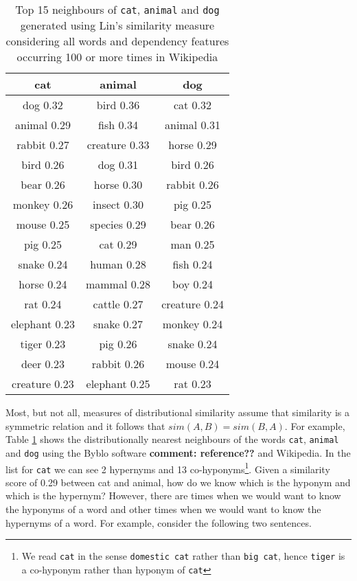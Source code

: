 \documentclass[11pt]{article}
\begin{document}
\begin{table}[ht]
\begin{tabular}{|c|c|c|}
\hline
cat&animal&dog\\
\hline
dog 0.32&bird 0.36&cat 0.32\\
animal 0.29&fish 0.34&animal 0.31\\
rabbit 0.27&creature 0.33&horse 0.29\\
bird 0.26&dog 0.31&bird 0.26\\
bear 0.26&horse 0.30&rabbit 0.26\\
monkey 0.26&insect 0.30&pig 0.25\\
mouse 0.25&species 0.29&bear 0.26\\
pig 0.25&cat 0.29&man 0.25\\
snake 0.24&human 0.28&fish 0.24\\
horse 0.24&mammal 0.28&boy 0.24\\
rat 0.24&cattle 0.27&creature 0.24\\
elephant 0.23&snake 0.27&monkey 0.24\\
tiger 0.23&pig 0.26&snake 0.24\\
deer 0.23&rabbit 0.26&mouse 0.24\\
creature 0.23&elephant 0.25&rat 0.23\\
\hline
\end{tabular}
\label{table:neighbours}
\caption{Top 15 neighbours of \texttt{cat}, \texttt{animal} and \texttt{dog} generated using Lin's similarity measure \cite{Lin1998} considering all words and dependency features occurring 100 or more times in Wikipedia}
\end{table}
Most, but not all, measures of distributional similarity assume that similarity is a symmetric relation and it follows that $sim(A,B) = sim(B,A)$.  For example, Table \ref{table:neighbours} shows the distributionally nearest neighbours of the words \texttt{cat}, \texttt{animal} and \texttt{dog} using the Byblo software {\bf comment: reference??} and Wikipedia.  In the list for \texttt{cat} we can see 2 hypernyms and 13 co-hyponyms\footnote{We read \texttt{cat} in the sense \texttt{domestic cat} rather than \texttt{big cat}, hence \texttt{tiger} is a co-hyponym rather than hyponym of \texttt{cat}}.  Given a similarity score of 0.29 between cat and animal, how do we know which is the hyponym and which is the hypernym? However, there are times when we would want to know the hyponyms of a word and other times when we would want to know the hypernyms of a word.  For example, consider the following two sentences.
\end{document}
